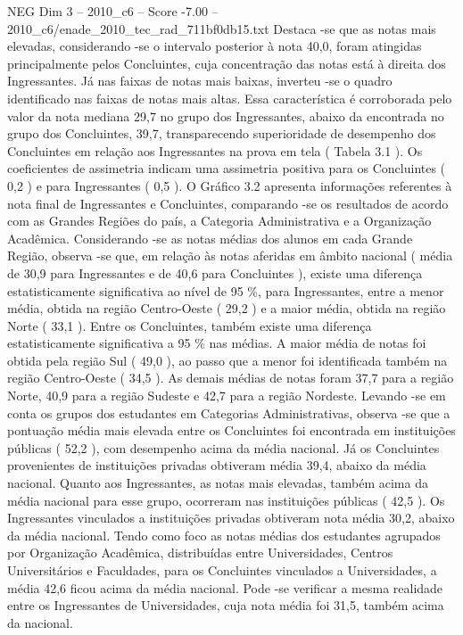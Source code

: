 \begin{textsample}{NEG Dim 3 – 2010\_c6 – Score -7.00 – 2010\_c6/enade\_2010\_tec\_rad\_711bf0db15.txt}
Destaca -se que as notas mais elevadas, considerando -se o intervalo posterior à nota 40,0, foram atingidas principalmente pelos Concluintes, cuja concentração das notas está à direita dos Ingressantes.
Já nas faixas de notas mais baixas, inverteu -se o quadro identificado nas faixas de notas mais altas.
Essa característica é corroborada pelo valor da nota mediana 29,7 no grupo dos Ingressantes, abaixo da encontrada no grupo dos Concluintes, 39,7, transparecendo superioridade de desempenho dos Concluintes em relação aos Ingressantes na prova em tela ( Tabela 3.1 ).
Os coeficientes de assimetria indicam uma assimetria positiva para os Concluintes ( 0,2 ) e para Ingressantes ( 0,5 ).
O Gráfico 3.2 apresenta informações referentes à nota final de Ingressantes e Concluintes, comparando -se os resultados de acordo com as Grandes Regiões do país, a Categoria Administrativa e a Organização Acadêmica.
Considerando -se as notas médias dos alunos em cada Grande Região, observa -se que, em relação às notas aferidas em âmbito nacional ( média de 30,9 para Ingressantes e de 40,6 para Concluintes ), existe uma diferença estatisticamente significativa ao nível de 95 \%, para Ingressantes, entre a menor média, obtida na região Centro-Oeste ( 29,2 ) e a maior média, obtida na região Norte ( 33,1 ).
Entre os Concluintes, também existe uma diferença estatisticamente significativa a 95 \% nas médias.
A maior média de notas foi obtida pela região Sul ( 49,0 ), ao passo que a menor foi identificada também na região Centro-Oeste ( 34,5 ).
As demais médias de notas foram 37,7 para a região Norte, 40,9 para a região Sudeste e 42,7 para a região Nordeste.
Levando -se em conta os grupos dos estudantes em Categorias Administrativas, observa -se que a pontuação média mais elevada entre os Concluintes foi encontrada em instituições públicas ( 52,2 ), com desempenho acima da média nacional.
Já os Concluintes provenientes de instituições privadas obtiveram média 39,4, abaixo da média nacional.
Quanto aos Ingressantes, as notas mais elevadas, também acima da média nacional para esse grupo, ocorreram nas instituições públicas ( 42,5 ).
Os Ingressantes vinculados a instituições privadas obtiveram nota média 30,2, abaixo da média nacional.
Tendo como foco as notas médias dos estudantes agrupados por Organização Acadêmica, distribuídas entre Universidades, Centros Universitários e Faculdades, para os Concluintes vinculados a Universidades, a média 42,6 ficou acima da média nacional.
Pode -se verificar a mesma realidade entre os Ingressantes de Universidades, cuja nota média foi 31,5, também acima da nacional.

\end{textsample}

